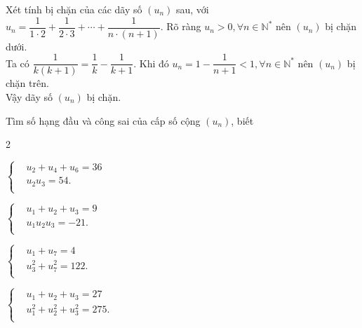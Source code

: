 \begin{bt}%
	Xét tính bị chặn của các dãy số $(u_n)$ sau, với $u_n=\dfrac{1}{1\cdot 2}+\dfrac{1}{2\cdot 3}+\cdots+\dfrac{1}{n\cdot (n+1)}$.
	\loigiai
	{
		Rõ ràng $u_n>0, \forall n \in \mathbb{N}^*$ nên $(u_n)$ bị chặn dưới.\\
		Ta có $\dfrac{1}{k(k+1)}=\dfrac{1}{k}-\dfrac{1}{k+1}$. Khi đó   $u_n=1-\dfrac{1}{n+1}<1, \forall n \in \mathbb{N}^*$ nên $(u_n)$ bị chặn trên.\\ Vậy dãy số $(u_n)$ bị chặn.	
	}
\end{bt}

\begin{bt}%
	Tìm số hạng đầu và công sai của cấp số cộng $(u_n)$, biết
	\begin{enumEX}{2}
		\item $\left\{\begin{aligned} 
			&u_2+u_4+u_6=36 \\
			&u_2u_3=54. \\
		\end{aligned}\right. $
		\item $\left\{\begin{aligned} 
			&u_1+u_2+u_3=9 \\
			&u_1u_2u_3=-21. \\
		\end{aligned}\right. $ 
		\item $\left\{\begin{aligned} 
			&u_1+u_7=4 \\
			&u_3^2+u_7^2=122. \\
		\end{aligned}\right. $
		\item $\left\{\begin{aligned} 
			&u_1+u_2+u_3=27 \\
			&u_1^2+u_2^2+u_3^2=275. \\
		\end{aligned}\right. $ 
	\end{enumEX}
\end{bt}

